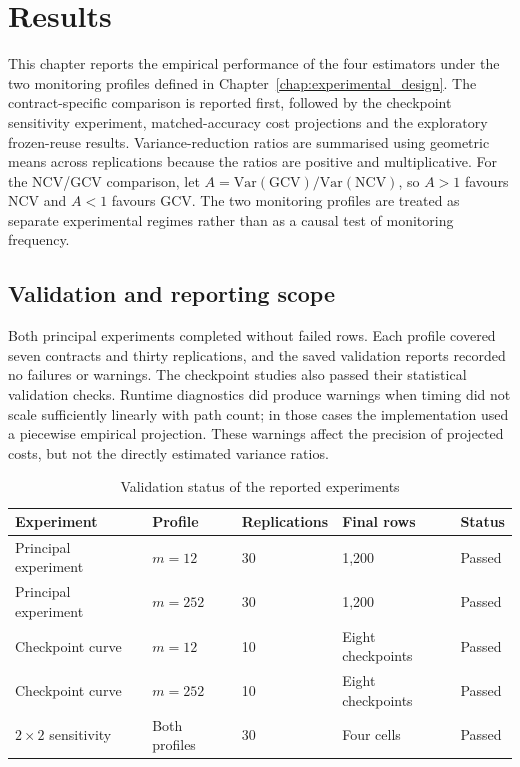 \chapter{Results}
\label{chap:results}

This chapter reports the empirical performance of the four estimators under the two monitoring profiles defined in Chapter~\ref{chap:experimental_design}. The contract-specific comparison is reported first, followed by the checkpoint sensitivity experiment, matched-accuracy cost projections and the exploratory frozen-reuse results. Variance-reduction ratios are summarised using geometric means across replications because the ratios are positive and multiplicative. For the NCV/GCV comparison, let $A = \mathrm{Var}(\mathrm{GCV})/\mathrm{Var}(\mathrm{NCV})$, so $A > 1$ favours NCV and $A < 1$ favours GCV. The two monitoring profiles are treated as separate experimental regimes rather than as a causal test of monitoring frequency.

\section{Validation and reporting scope}

Both principal experiments completed without failed rows. Each profile covered seven contracts and thirty replications, and the saved validation reports recorded no failures or warnings. The checkpoint studies also passed their statistical validation checks. Runtime diagnostics did produce warnings when timing did not scale sufficiently linearly with path count; in those cases the implementation used a piecewise empirical projection. These warnings affect the precision of projected costs, but not the directly estimated variance ratios.

\begin{table}[htbp]
    \centering
    \caption{Validation status of the reported experiments}
    \label{tab:validation_status}
    \begin{tabular}{llll}
        \hline
        Experiment & Profile & Replications & Final rows & Status \\
        \hline
        Principal experiment & $m = 12$ & 30 & 1{,}200 & Passed \\
        Principal experiment & $m = 252$ & 30 & 1{,}200 & Passed \\
        Checkpoint curve & $m = 12$ & 10 & Eight checkpoints & Passed \\
        Checkpoint curve & $m = 252$ & 10 & Eight checkpoints & Passed \\
        $2 \times 2$ sensitivity & Both profiles & 30 & Four cells & Passed \\
        \hline
    \end{tabular}
\end{table}

